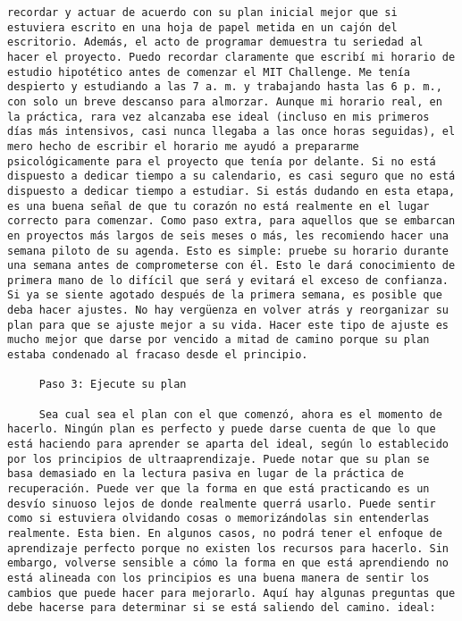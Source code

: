 \begin{verbatim}
recordar y actuar de acuerdo con su plan inicial mejor que si estuviera escrito en una hoja de papel metida en un cajón del escritorio. Además, el acto de programar demuestra tu seriedad al hacer el proyecto. Puedo recordar claramente que escribí mi horario de estudio hipotético antes de comenzar el MIT Challenge. Me tenía despierto y estudiando a las 7 a. m. y trabajando hasta las 6 p. m., con solo un breve descanso para almorzar. Aunque mi horario real, en la práctica, rara vez alcanzaba ese ideal (incluso en mis primeros días más intensivos, casi nunca llegaba a las once horas seguidas), el mero hecho de escribir el horario me ayudó a prepararme psicológicamente para el proyecto que tenía por delante. Si no está dispuesto a dedicar tiempo a su calendario, es casi seguro que no está dispuesto a dedicar tiempo a estudiar. Si estás dudando en esta etapa, es una buena señal de que tu corazón no está realmente en el lugar correcto para comenzar. Como paso extra, para aquellos que se embarcan en proyectos más largos de seis meses o más, les recomiendo hacer una semana piloto de su agenda. Esto es simple: pruebe su horario durante una semana antes de comprometerse con él. Esto le dará conocimiento de primera mano de lo difícil que será y evitará el exceso de confianza. Si ya se siente agotado después de la primera semana, es posible que deba hacer ajustes. No hay vergüenza en volver atrás y reorganizar su plan para que se ajuste mejor a su vida. Hacer este tipo de ajuste es mucho mejor que darse por vencido a mitad de camino porque su plan estaba condenado al fracaso desde el principio.
	 
	 Paso 3: Ejecute su plan
	 
	 Sea cual sea el plan con el que comenzó, ahora es el momento de hacerlo. Ningún plan es perfecto y puede darse cuenta de que lo que está haciendo para aprender se aparta del ideal, según lo establecido por los principios de ultraaprendizaje. Puede notar que su plan se basa demasiado en la lectura pasiva en lugar de la práctica de recuperación. Puede ver que la forma en que está practicando es un desvío sinuoso lejos de donde realmente querrá usarlo. Puede sentir como si estuviera olvidando cosas o memorizándolas sin entenderlas realmente. Esta bien. En algunos casos, no podrá tener el enfoque de aprendizaje perfecto porque no existen los recursos para hacerlo. Sin embargo, volverse sensible a cómo la forma en que está aprendiendo no está alineada con los principios es una buena manera de sentir los cambios que puede hacer para mejorarlo. Aquí hay algunas preguntas que debe hacerse para determinar si se está saliendo del camino. ideal:
	 

\end{verbatim}
